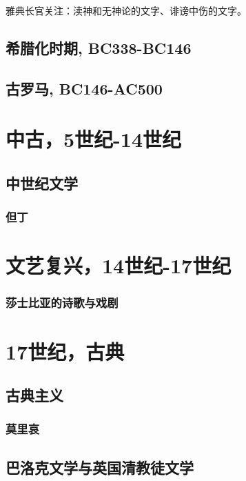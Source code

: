 \documentclass[UTF8]{../../RepresentationUniverse}
\begin{document}
雅典长官关注：渎神和无神论的文字、诽谤中伤的文字。

\section{希腊化时期, BC338-BC146}


\section{古罗马, BC146-AC500}






\chapter{中古，5世纪-14世纪}
\section{中世纪文学}


\subsection{但丁}



\chapter{文艺复兴，14世纪-17世纪}



\subsection{莎士比亚的诗歌与戏剧}





\chapter{17世纪，古典}

\section{古典主义}

\subsection{莫里哀}

\section{巴洛克文学与英国清教徒文学}
\end{document}

